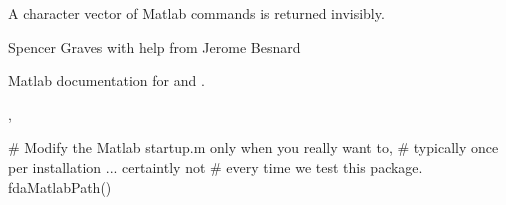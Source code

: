 \begin{Value}
A character vector of Matlab  commands is returned
invisibly.
\end{Value}
\begin{Author}\relax
Spencer Graves with help from Jerome Besnard
\end{Author}
\begin{References}\relax
Matlab documentation for  and .
\end{References}
\begin{SeeAlso}\relax
{},
\end{SeeAlso}
\begin{Examples}
\begin{ExampleCode}
# Modify the Matlab startup.m only when you really want to,
# typically once per installation ... certaintly not
# every time we test this package.
fdaMatlabPath()
\end{ExampleCode}
\end{Examples}

